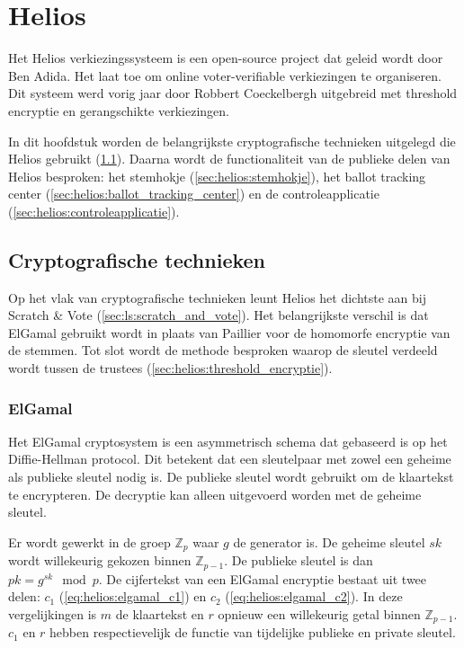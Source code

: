 % 
%

\chapter{Helios}
\label{chap:helios}

Het Helios verkiezingssysteem is een open-source project dat geleid wordt door Ben Adida.\cite{adida_helios} Het laat toe om online voter-verifiable verkiezingen te organiseren. Dit systeem werd vorig jaar door Robbert Coeckelbergh uitgebreid met threshold encryptie en gerangschikte verkiezingen.\cite{coeckelbergh_toepassing_en_uitbreiding_van_het_helios_online_verkiezingssysteem} 

\npar In dit hoofdstuk worden de belangrijkste cryptografische technieken uitgelegd die Helios gebruikt (\ref{sec:helios:cryptografische_technieken}). Daarna wordt de functionaliteit van de publieke delen van Helios besproken: het stemhokje (\ref{sec:helios:stemhokje}), het ballot tracking center (\ref{sec:helios:ballot_tracking_center}) en de controleapplicatie (\ref{sec:helios:controleapplicatie}).

\section{Cryptografische technieken}
\label{sec:helios:cryptografische_technieken}

Op het vlak van cryptografische technieken leunt Helios het dichtste aan bij Scratch \& Vote (\ref{sec:ls:scratch_and_vote}). Het belangrijkste verschil is dat ElGamal gebruikt wordt in plaats van Paillier voor de homomorfe encryptie van de stemmen. Tot slot wordt de methode besproken waarop de sleutel verdeeld wordt tussen de trustees (\ref{sec:helios:threshold_encryptie}).

\subsection{ElGamal~\cite{elgamal_elgamal}}
\label{sec:helios:elgamal}

Het ElGamal cryptosystem is een asymmetrisch schema dat gebaseerd is op het Diffie-Hellman protocol. Dit betekent dat een sleutelpaar met zowel een geheime als publieke sleutel nodig is. De publieke sleutel wordt gebruikt om de klaartekst te encrypteren. De decryptie kan alleen uitgevoerd worden met de geheime sleutel.

\npar Er wordt gewerkt in de groep $\mathbb{Z}_p$ waar $g$ de generator is. De geheime sleutel $sk$ wordt willekeurig gekozen binnen $\mathbb{Z}_{p-1}$. De publieke sleutel is dan ${pk} = g^{sk} \mod{p}$. De cijfertekst van een ElGamal encryptie bestaat uit twee delen: $c_1$ (\ref{eq:helios:elgamal_c1}) en $c_2$ (\ref{eq:helios:elgamal_c2}). In deze vergelijkingen is $m$ de klaartekst en $r$ opnieuw een willekeurig getal binnen $\mathbb{Z}_{p-1}$. $c_1$ en $r$ hebben respectievelijk de functie van tijdelijke publieke en private sleutel.\cite{preneel_cryptography_and_network_security}

